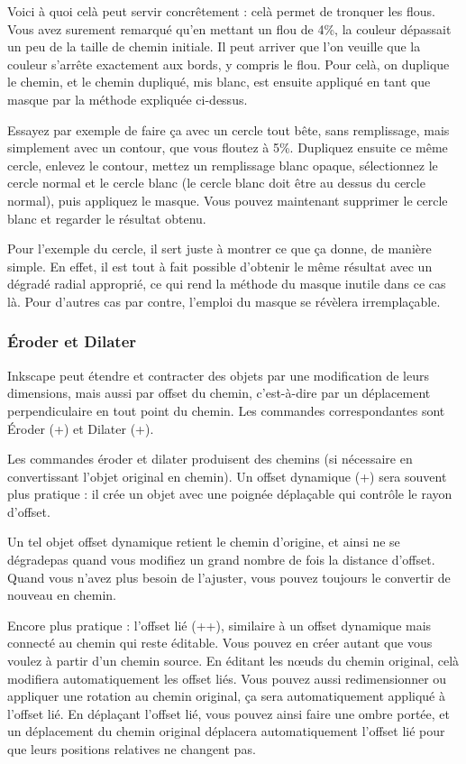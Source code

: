 \documentclass[a4paper,twoside]{article}
\begin{document}
Voici à quoi celà peut servir concrêtement : celà permet de tronquer les flous. Vous avez surement remarqué qu'en mettant un flou de 4\%, la couleur dépassait un peu de la taille de chemin initiale. Il peut arriver que l'on veuille que la couleur s'arrête exactement aux bords, y compris le flou. Pour celà, on duplique le chemin, et le chemin dupliqué, mis blanc, est ensuite appliqué en tant que masque par la méthode expliquée ci-dessus.

Essayez par exemple de faire ça avec un cercle tout bête, sans remplissage, mais simplement avec un contour, que vous floutez à 5\%. Dupliquez ensuite ce même cercle, enlevez le contour, mettez un remplissage blanc opaque, sélectionnez le cercle normal et le cercle blanc (le cercle blanc doit être au dessus du cercle normal), puis appliquez le masque. Vous pouvez maintenant supprimer le cercle blanc et regarder le résultat obtenu.

\begin{remarque}
Pour l'exemple du cercle, il sert juste à montrer ce que ça donne, de manière simple. En effet, il est tout à fait possible d'obtenir le même résultat avec un dégradé radial approprié, ce qui rend la méthode du masque inutile dans ce cas là. Pour d'autres cas par contre, l'emploi du masque se révèlera irremplaçable.
\end{remarque}

\subsubsection{Éroder et Dilater}
Inkscape peut étendre et contracter des objets par une modification de leurs dimensions, mais aussi par offset du chemin, c'est-à-dire par un déplacement perpendiculaire en tout point du chemin. Les commandes correspondantes sont Éroder (+\touche{(}) et Dilater (+\touche{)}).

Les commandes éroder et dilater produisent des chemins (si nécessaire en convertissant l'objet original en chemin). Un offset dynamique (+) sera souvent plus pratique : il crée un objet avec une poignée déplaçable qui contrôle le rayon d'offset.

Un tel objet offset dynamique retient le chemin d'origine, et ainsi ne se \og dégrade\fg pas quand vous modifiez un grand nombre de fois la distance d'offset. Quand vous n'avez plus besoin de l'ajuster, vous pouvez toujours le convertir de nouveau en chemin.

Encore plus pratique : l'offset lié (++), similaire à un offset dynamique mais connecté au chemin qui reste éditable. Vous pouvez en créer autant que vous voulez à partir d'un chemin source. En éditant les n\oe uds du chemin original, celà modifiera automatiquement les offset liés. Vous pouvez aussi redimensionner ou appliquer une rotation au chemin original, ça sera automatiquement appliqué à l'offset lié. En déplaçant l'offset lié, vous pouvez ainsi faire une ombre portée, et un déplacement du chemin original déplacera automatiquement l'offset lié pour que leurs positions relatives ne changent pas.
\end{document}
